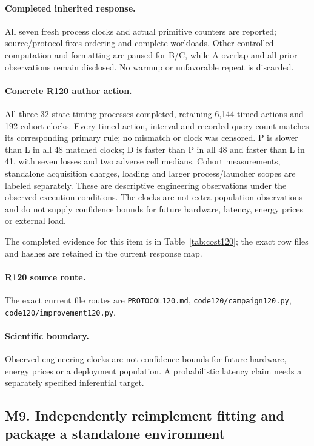\paragraph{Completed inherited response.}
All seven fresh process clocks and actual primitive counters are reported; source/protocol fixes ordering and complete workloads. Other controlled computation and formatting are paused for B/C, while A overlap and all prior observations remain disclosed. No warmup or unfavorable repeat is discarded.
\paragraph{Concrete R120 author action.}
All three 32-state timing processes completed, retaining 6,144 timed actions and 192 cohort clocks. Every timed action, interval and recorded query count matches its corresponding primary rule; no mismatch or clock was censored. P is slower than L in all 48 matched clocks; D is faster than P in all 48 and faster than L in 41, with seven losses and two adverse cell medians. Cohort measurements, standalone acquisition charges, loading and larger process/launcher scopes are labeled separately. These are descriptive engineering observations under the observed execution conditions. The clocks are not extra population observations and do not supply confidence bounds for future hardware, latency, energy prices or external load.

The completed evidence for this item is in Table~\ref{tab:cost120}; the exact row files and hashes are retained in the current response map.
\paragraph{R120 source route.}
The exact current file routes are \nolinkurl{PROTOCOL120.md}, \nolinkurl{code120/campaign120.py}, \nolinkurl{code120/improvement120.py}.
\paragraph{Scientific boundary.}
Observed engineering clocks are not confidence bounds for future hardware, energy prices or a deployment population. A probabilistic latency claim needs a separately specified inferential target.

\subsection{M9. Independently reimplement fitting and package a standalone environment}
\label{response120:M9}
